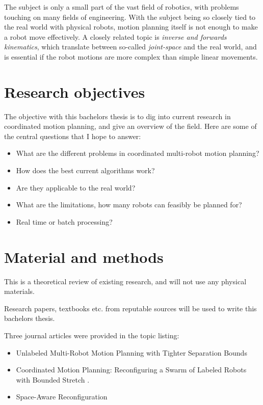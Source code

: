 \documentclass[12pt,a4paper,english,oneside]{article}
\begin{document}
The subject is only a small part of the vast field of robotics, with problems touching on many fields of engineering. 
With the subject being so closely tied to the real world with physical robots, motion planning itself is not enough to make a robot move effectively. 
A closely related topic is \emph{inverse and forwards kinematics}, which translate between so-called \emph{joint-space} and the real world, and is essential if the robot motions are more complex than simple linear movements. 

\section{Research objectives}

The objective with this bachelors thesis is to dig into current research in coordinated motion planning, and give an overview of the field. Here are some of the central questions that I hope to answer: 

\begin{itemize}
	\item What are the different problems in coordinated multi-robot motion planning?
	\item How does the best current algorithms work?
	\item Are they applicable to the real world?
	\item What are the limitations, how many robots can feasibly be planned for?
	\item Real time or batch processing? 
\end{itemize}


\section{Material and methods}

This is a theoretical review of existing research, and will not use any physical materials. 

Research papers, textbooks etc. from reputable sources will be used to write this bachelors thesis.

Three journal articles were provided in the topic listing:

\begin{itemize}
	\item Unlabeled Multi-Robot Motion Planning with Tighter Separation Bounds \cite{banyassady_unlabeled_2022}
	\item Coordinated Motion Planning: Reconfiguring a Swarm of Labeled Robots with Bounded Stretch \cite{demaine_coordinated_2019}.
	\item Space-Aware Reconfiguration \cite{halperin_space-aware_2022}
\end{itemize}
\end{document}
